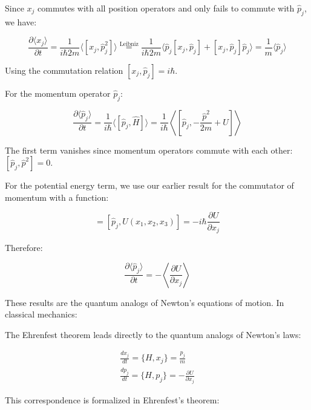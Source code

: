 \documentclass[italian]{HKNdocument}
\begin{document}
Since $x_j$ commutes with all position operators and only fails to commute with $\hat{p}_j$, we have:

\begin{equation*}
\frac{\partial\langle x_j\rangle}{\partial t} = \frac{1}{i\hbar 2m}\langle[x_j,\hat{p}_j^2]\rangle \stackrel{\text{Leibniz}}{=} \frac{1}{i\hbar 2m}\langle\hat{p}_j[x_j,\hat{p}_j]+[x_j,\hat{p}_j]\hat{p}_j\rangle = \frac{1}{m}\langle\hat{p}_j\rangle \tag{1.90}
\end{equation*}

Using the commutation relation $[x_j,\hat{p}_j] = i\hbar$.

For the momentum operator $\hat{p}_j$:

\begin{equation*}
\frac{\partial\langle\hat{p}_j\rangle}{\partial t} = \frac{1}{i\hbar}\langle[\hat{p}_j,\hat{H}]\rangle = \frac{1}{i\hbar}\left\langle\left[\hat{p}_j,-\frac{\hat{p}^2}{2m}+U\right]\right\rangle \tag{1.91}
\end{equation*}

The first term vanishes since momentum operators commute with each other: $[\hat{p}_j,\hat{p}^2] = 0$.

For the potential energy term, we use our earlier result for the commutator of momentum with a function:

\begin{equation*}
[\hat{p}_j,U] = [\hat{p}_j,U(x_1,x_2,x_3)] = -i\hbar\frac{\partial U}{\partial x_j} \tag{1.92}
\end{equation*}

Therefore:

\begin{equation*}
\frac{\partial\langle\hat{p}_j\rangle}{\partial t} = -\left\langle\frac{\partial U}{\partial x_j}\right\rangle \tag{1.93}
\end{equation*}

These results are the quantum analogs of Newton's equations of motion. In classical mechanics:


The Ehrenfest theorem leads directly to the quantum analogs of Newton's laws:

\[
\begin{array}{r}
\frac{dx_j}{dt} = \{H, x_j\} = \frac{p_j}{m} \\
\frac{dp_j}{dt} = \{H, p_j\} = -\frac{\partial U}{\partial x_j} \tag{1.94}
\end{array}
\]

This correspondence is formalized in Ehrenfest's theorem:
\end{document}
